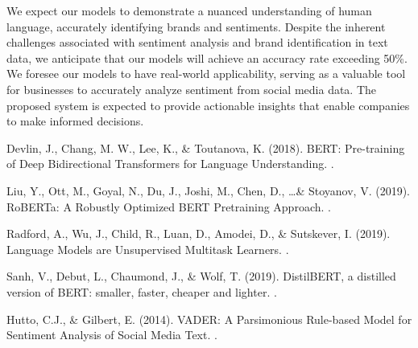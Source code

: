 \documentclass{article}
\begin{document}
We expect our models to demonstrate a nuanced understanding of human language,
accurately identifying brands and sentiments. Despite the inherent challenges
associated with sentiment analysis and brand identification in text data, we
anticipate that our models will achieve an accuracy rate exceeding 50\%. We
foresee our models to have real-world applicability, serving as a valuable tool
for businesses to accurately analyze sentiment from social media data. The
proposed system is expected to provide actionable insights that enable
companies to make informed decisions.

\newpage

\begin{thebibliography}{}

    Devlin, J., Chang, M. W., Lee, K., \& Toutanova, K. (2018). \newblock BERT:
    Pre-training of Deep Bidirectional Transformers for Language Understanding.
    .

    Liu, Y., Ott, M., Goyal, N., Du, J., Joshi, M., Chen, D., \ldots \&
    Stoyanov, V. (2019). \newblock RoBERTa: A Robustly Optimized BERT Pretraining
    Approach. .

    Radford, A., Wu, J., Child, R., Luan, D., Amodei, D., \& Sutskever, I.
    (2019). \newblock Language Models are Unsupervised Multitask Learners.
    .

    Sanh, V., Debut, L., Chaumond, J., \& Wolf, T. (2019). \newblock
    DistilBERT, a distilled version of BERT: smaller, faster, cheaper and lighter.
    .

    Hutto, C.J., \& Gilbert, E. (2014). \newblock VADER: A Parsimonious
    Rule-based Model for Sentiment Analysis of Social Media Text. .

\end{thebibliography}

\thispagestyle{empty}
\end{document}
